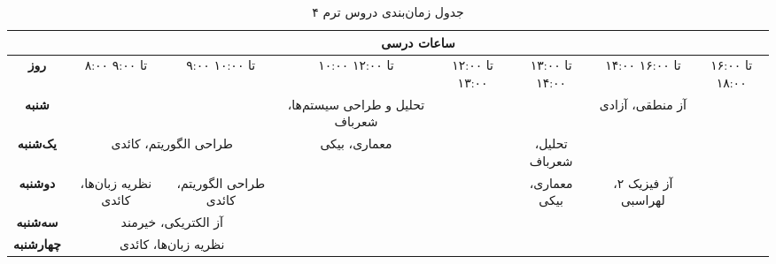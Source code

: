 \documentclass{article}
\begin{document}
	
 	\begin{sidewaystable}[h]
		\begin{center}	
 			\caption{جدول زمان‌بندی دروس ترم ۴}	
			\begin{tabular}{|c|c|c|c|c|c|c|c|c|c|c|}
				\cline{2-11}
				\multicolumn{1}{c}{}
				& \multicolumn{10}{|c|}{\textbf{ساعات درسی}} \\ \hline
			   \textbf{روز} & ۸:۰۰ تا ۹:۰۰ & ۹:۰۰ تا ۱۰:۰۰ &
     			\multicolumn{2}{|c|}{۱۰:۰۰ تا ۱۲:۰۰} &
     			۱۲:۰۰ تا ۱۳:۰۰ & ۱۳:۰۰ تا ۱۴:۰۰ &
				\multicolumn{2}{|c|}{۱۴:۰۰ تا ۱۶:۰۰} &
				\multicolumn{2}{|c|}{۱۶:۰۰ تا ۱۸:۰۰} \\
				\hline
				\hline
				
				\textbf{شنبه} &
				\multicolumn{2}{|c|}{} &
				\multicolumn{2}{|c|}{تحلیل و طراحی سیستم‌ها، شعرباف} &
				\multicolumn{2}{|c|}{} &
				\multicolumn{2}{|c|}{آز منطقی، آزادی} &
				\multicolumn{2}{|c|}{} \\
				\hline
				
				\textbf{یک‌شنبه} &
				\multicolumn{2}{|c|}{طراحی الگوریتم، کائدی} &
				\multicolumn{2}{|c|}{معماری، بیکی} &
				 & تحلیل، شعرباف &
				\multicolumn{2}{|c|}{} &
				\multicolumn{2}{|c|}{} \\
				\hline
				\textbf{دوشنبه} &
				نظریه زبان‌ها، کائدی & طراحی الگوریتم، کائدی &
				\multicolumn{2}{|c|}{} &
				& معماری، بیکی &
				\multicolumn{2}{|c|}{آز فیزیک ۲، لهراسبی} &
				\multicolumn{2}{|c|}{} \\
				\hline
				
				\textbf{سه‌شنبه} &
				\multicolumn{2}{|c|}{آز الکتریکی، خیرمند} &
                \multicolumn{2}{|c|}{} &
				\multicolumn{2}{|c|}{} &
				\multicolumn{2}{|c|}{} &
				\multicolumn{2}{|c|}{} \\
				\hline
				
				\textbf{چهارشنبه} &
				\multicolumn{2}{|c|}{نظریه زبان‌ها، کائدی} &
				\multicolumn{2}{|c|}{} &
				\multicolumn{2}{|c|}{} &
				\multicolumn{2}{|c|}{} &
				\multicolumn{2}{|c|}{} \\
				\hline
            \end{tabular}
		\end{center}
 	\end{sidewaystable}
\end{document}
